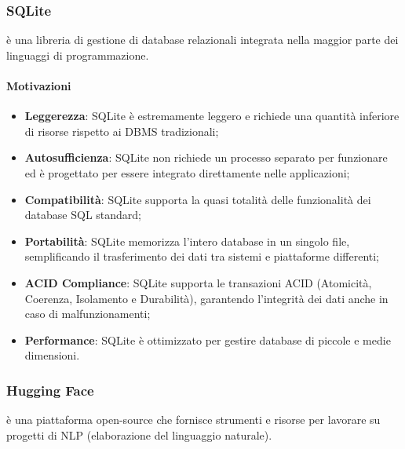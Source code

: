 \subsubsection{SQLite}\label{sec:SQLite}
\par {} è una libreria di gestione di database relazionali integrata nella maggior parte dei linguaggi di programmazione.
\paragraph*{Motivazioni}
\begin{itemize}
  \item \textbf{Leggerezza}: SQLite è estremamente leggero e richiede una quantità inferiore di risorse rispetto ai DBMS tradizionali;
  \item \textbf{Autosufficienza}: SQLite non richiede un processo separato per funzionare ed è progettato per essere integrato direttamente nelle applicazioni;
  \item \textbf{Compatibilità}: SQLite supporta la quasi totalità delle funzionalità dei database SQL standard;
  \item \textbf{Portabilità}: SQLite memorizza l'intero database in un singolo file, semplificando il trasferimento dei dati tra sistemi e piattaforme differenti;
  \item \textbf{ACID Compliance}: SQLite supporta le transazioni ACID (Atomicità, Coerenza, Isolamento e Durabilità), garantendo l'integrità dei dati anche in caso di malfunzionamenti;
  \item \textbf{Performance}: SQLite è ottimizzato per gestire database di piccole e medie dimensioni.
\end{itemize}

\subsubsection{Hugging Face}\label{sec:huggingface}
\par {} è una piattaforma open-source che fornisce strumenti e risorse per lavorare su progetti di NLP (elaborazione del linguaggio naturale).
